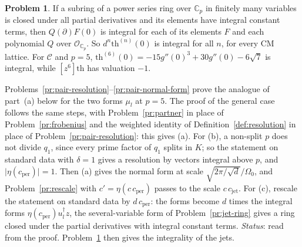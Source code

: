 \documentclass[reqno]{amsart}
\theoremstyle{plain}
\theoremstyle{definition}
\newtheorem{problem}{Problem}[section]
\theoremstyle{remark}
\newcommand{\C}{\mathbb{C}}
\newcommand{\Op}{\mathcal{O}_{\C_p}}
\newcommand{\tth}{\mathrm{th}}
\newcommand{\cjet}{c_{\mathrm{jet}}}
\newcommand{\cper}{c_{\mathrm{per}}}
\begin{document}
\begin{problem}\label{pr:derivatives}
If a subring of a power series ring over \(\C_p\) in finitely many variables is closed under all partial derivatives and its elements have integral constant terms, then \(Q(\partial)F(0)\) is integral for each of its elements \(F\) and each polynomial \(Q\) over \(\Op\).  So \(d^n\tth^{(n)}(0)\) is integral for all \(n\), for every CM lattice.  For \(\mathcal C\) and \(p = 5\), \(\tth^{(6)}(0) = -15g''(0)^3 + 30g''(0) - 6\sqrt7\) is integral, while \([z^6]\tth\) has valuation \(-1\).
\end{problem}

Problems~\ref{pr:pair-resolution}--\ref{pr:pair-normal-form} prove the analogue of part~(a) below for the two forms \(\mu_l\) at \(p = 5\).  The proof of the general case \cite{GL} follows the same steps, with Problem~\ref{pr:partner} in place of Problem~\ref{pr:frobenius} and the weighted identity of Definition~\ref{def:resolution} in place of Problem~\ref{pr:pair-resolution}: this gives (a).  For (b), a non-split \(p\) does not divide \(q_1\), since every prime factor of \(q_1\) splits in \(K\); so the statement on standard data with \(\delta = 1\) gives a resolution by vectors integral above \(p\), and \(\lvert\eta(\cper)\rvert = 1\).  Then (a) gives the normal form at scale \(\sqrt{2\pi/\sqrt d}/\Omega_0\), and Problem~\ref{pr:rescale} with \(c' = \eta(c\,\cper)\) passes to the scale \(c\,\cjet\).  For (c), rescale the statement on standard data by \(d\,\cper\): the forms become \(d\) times the integral forms \(\eta(\cper)u_l^\dagger z\), the several-variable form of Problem~\ref{pr:jet-ring} gives a ring closed under the partial derivatives with integral constant terms.  \emph{Status}: read from the proof.  Problem~\ref{pr:derivatives} then gives the integrality of the jets.
\end{document}
